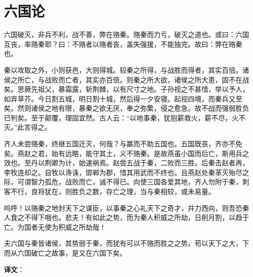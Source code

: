 \documentclass[12pt,UTF-8,openany]{ctexbook}
\begin{document}
\chapter{六国论}

\begin{normalsize}
    
    六国破灭，非兵不利，战不善，弊在赂秦。赂秦而力亏，破灭之道也。或曰：六国互丧，率赂秦耶？曰：不赂者以赂者丧，盖失强援，不能独完。故曰：弊在赂秦也。
    
    秦以攻取之外，小则获邑，大则得城。较秦之所得，与战胜而得者，其实百倍。诸侯之所亡，与战败而亡者，其实亦百倍。则秦之所大欲，诸侯之所大患，固不在战矣。思厥先祖父，暴霜露，斩荆棘，以有尺寸之地。子孙视之不甚惜，举以予人，如弃草芥。今日割五城，明日割十城，然后得一夕安寝。起视四境，而秦兵又至矣。然则诸侯之地有限，暴秦之欲无厌，奉之弥繁，侵之愈急。故不战而强弱胜负已判矣。至于颠覆，理固宜然。古人云：“以地事秦，犹抱薪救火，薪不尽，火不灭。”此言得之。
    
    齐人未尝赂秦，终继五国迁灭，何哉？与嬴而不助五国也。五国既丧，齐亦不免矣。燕赵之君，始有远略，能守其土，义不赂秦。是故燕虽小国而后亡，斯用兵之效也。至丹以荆卿为计，始速祸焉。赵尝五战于秦，二败而三胜。后秦击赵者再，李牧连却之。自牧以谗诛，邯郸为郡，惜其用武而不终也。且燕赵处秦革灭殆尽之际，可谓智力孤危，战败而亡，诚不得已。向使三国各爱其地，齐人勿附于秦，刺客不行，良将犹在，则胜负之数，存亡之理，当与秦相较，或未易量。
    
    呜呼！以赂秦之地封天下之谋臣，以事秦之心礼天下之奇才，并力西向，则吾恐秦人食之不得下咽也。悲夫！有如此之势，而为秦人积威之所劫，日削月割，以趋于亡。为国者无使为积威之所劫哉！
    
    夫六国与秦皆诸侯，其势弱于秦，而犹有可以不赂而胜之之势。苟以天下之大，下而从六国破亡之故事，是又在六国下矣。
\end{normalsize}


\newpage

\textbf{译文}：

\vspace{1em}
\end{document}
